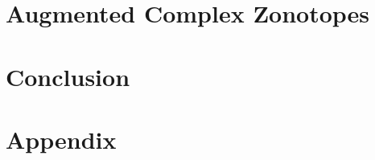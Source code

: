 \documentclass[11pt,a4paper,twoside,openright]{book}
\begin{document}
\chapter{Augmented Complex Zonotopes} \label{sec:ch2} 
%
\chapter{Conclusion} \label{sec:concl} 
%  


\appendix
\chapter{Appendix} 

{}




\end{document}
